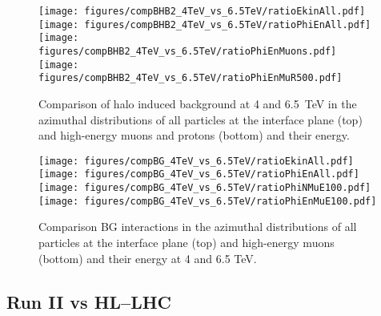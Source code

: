 \begin{figure}[!htb]
\begin{center}
  \texttt{[image: figures/compBHB2\_4TeV\_vs\_6.5TeV/ratioEkinAll.pdf]}
  \texttt{[image: figures/compBHB2\_4TeV\_vs\_6.5TeV/ratioPhiEnAll.pdf]}
  \texttt{[image: figures/compBHB2\_4TeV\_vs\_6.5TeV/ratioPhiEnMuons.pdf]}
  \texttt{[image: figures/compBHB2\_4TeV\_vs\_6.5TeV/ratioPhiEnMuR500.pdf]}
\end{center}
\vspace{-0.6cm}
 \caption{Comparison of halo induced background at 4 and 6.5~TeV in the azimuthal distributions of all particles at the interface plane (top) and high-energy muons and protons (bottom) and their energy.
  \label{compBHB2run1run2}}
\end{figure}



\begin{figure}[!htb]
\begin{center}
  \texttt{[image: figures/compBG\_4TeV\_vs\_6.5TeV/ratioEkinAll.pdf]}
  \texttt{[image: figures/compBG\_4TeV\_vs\_6.5TeV/ratioPhiEnAll.pdf]}
  \texttt{[image: figures/compBG\_4TeV\_vs\_6.5TeV/ratioPhiNMuE100.pdf]}
  \texttt{[image: figures/compBG\_4TeV\_vs\_6.5TeV/ratioPhiEnMuE100.pdf]}
\end{center}
\vspace{-0.6cm}
 \caption{Comparison BG interactions in the azimuthal distributions of all particles at the interface plane (top) and high-energy muons (bottom) and their energy at 4 and 6.5 TeV.
  \label{compBGrun1run2}}
\end{figure}


\subsection{Run II vs HL--LHC}
